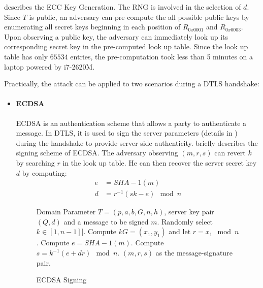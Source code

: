   describes the ECC Key Generation. The RNG is involved in the selection of $d$. Since $T$ is public, an adversary can pre-compute the all possible public keys by enumerating all secret keys beginning in each position of $R_{0x0001}$ and $R_{0x0003}$. Upon observing a public key, the adversary can immediately look up its corresponding secret key in the pre-computed look up table. Since the look up table has only $65534$ entries, the pre-computation took less than 5 minutes on a laptop powered by i7-2620M. 
 
Practically, the attack can be applied to two scenarios during a DTLS handshake:
\begin{itemize}
	\item \paragraph{\textbf{ECDSA}}
	ECDSA is an authentication scheme that allows a party to authenticate a message. In DTLS, it is used to sign the server parameters (details in \cite{rfc3279}) during the handshake to provide server side authenticity.  briefly describes the signing scheme of ECDSA. The adversary observing $(m,r,s)$ can revert $k$ by searching $r$ in the look up table. He can then recover the server secret key $d$ by computing:
	\begin{equation}
		\begin{aligned}
		e &= SHA-1(m) \\
		d &= r^{-1}(sk - e) \mod n
		\end{aligned}
	\end{equation}
	
	\begin{figure}
		\begin{algorithmic}[1]
		\scriptsize
		\REQUIRE Domain Parameter $T = (p, a, b, G, n, h)$, server key pair $(Q,d)$ and a message to be signed $m$.
		\STATE Randomly select $k \in [1, n-1]]$.
		\STATE Compute $kG = (x_1, y_1)$ and let $r = x_1 \mod n$.
		\STATE Compute $e = SHA-1(m)$.
		\STATE Compute $s = k^{-1}(e + dr) \mod n$.
		\RETURN $(m,r,s)$ as the message-signature pair.
		\end{algorithmic}
		\caption{ECDSA Signing}
		\label{ECDSA}
	\end{figure}
	

\end{itemize}
